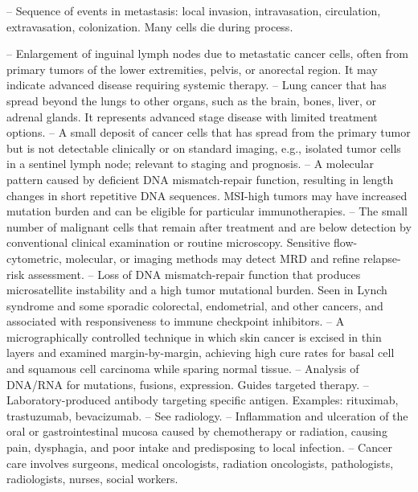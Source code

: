 -- Sequence of events in metastasis: local invasion, intravasation, circulation, extravasation, colonization. Many cells die during process.

-- Enlargement of inguinal lymph nodes due to metastatic cancer cells, often from primary tumors of the lower extremities, pelvis, or anorectal region. It may indicate advanced disease requiring systemic therapy.
-- Lung cancer that has spread beyond the lungs to other organs, such as the brain, bones, liver, or adrenal glands. It represents advanced stage disease with limited treatment options.
-- A small deposit of cancer cells that has spread from the primary tumor but is not detectable clinically or on standard imaging, e.g., isolated tumor cells in a sentinel lymph node; relevant to staging and prognosis.
-- A molecular pattern caused by deficient DNA mismatch-repair function, resulting in length changes in short repetitive DNA sequences. MSI-high tumors may have increased mutation burden and can be eligible for particular immunotherapies.
-- The small number of malignant cells that remain after treatment and are below detection by conventional clinical examination or routine microscopy. Sensitive flow-cytometric, molecular, or imaging methods may detect MRD and refine relapse-risk assessment.
-- Loss of DNA mismatch-repair function that produces microsatellite instability and a high tumor mutational burden. Seen in Lynch syndrome and some sporadic colorectal, endometrial, and other cancers, and associated with responsiveness to immune checkpoint inhibitors.
-- A micrographically controlled technique in which skin cancer is excised in thin layers and examined margin-by-margin, achieving high cure rates for basal cell and squamous cell carcinoma while sparing normal tissue.
-- Analysis of DNA/RNA for mutations, fusions, expression. Guides targeted therapy.
-- Laboratory-produced antibody targeting specific antigen. Examples: rituximab, trastuzumab, bevacizumab.
-- See radiology.
-- Inflammation and ulceration of the oral or gastrointestinal mucosa caused by chemotherapy or radiation, causing pain, dysphagia, and poor intake and predisposing to local infection.
-- Cancer care involves surgeons, medical oncologists, radiation oncologists, pathologists, radiologists, nurses, social workers.
